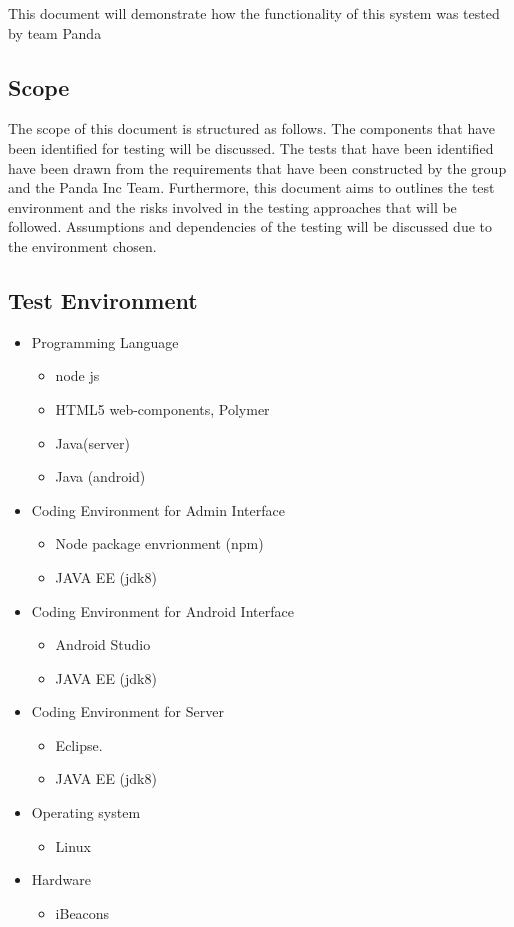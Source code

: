 \documentclass[11pt]{article}
\begin{document}
This document will demonstrate how the functionality of this system was tested by team Panda

\subsection{Scope}
The scope of this document is structured as follows. The components that have been identified for testing will be discussed. The tests that have been identified have been drawn from the requirements that have been constructed by the group and the Panda Inc Team. Furthermore, this document aims to outlines the test environment and the risks involved in the testing approaches that will be followed. Assumptions and dependencies of the testing will be discussed due to the environment chosen.
\subsection{Test Environment}
\begin{itemize}
	\item Programming Language
	\begin{itemize}
		\item node js
		\item HTML5 web-components, Polymer
		\item Java(server)
		\item Java (android)
	\end{itemize}
	
	\item Coding Environment for Admin Interface
	\begin{itemize}
		\item Node package envrionment (npm)
		\item JAVA EE (jdk8)
	\end{itemize}
	
	\item Coding Environment for Android Interface
	\begin{itemize}
		\item Android Studio
		\item JAVA EE (jdk8)
	\end{itemize}
	\item Coding Environment for Server
	\begin{itemize}
		\item Eclipse.
		\item JAVA EE (jdk8)
	\end{itemize}
	
	\item Operating system
	\begin{itemize}
		\item Linux
	\end{itemize}
	
	\item Hardware
	\begin{itemize}
		\item iBeacons
	\end{itemize}
\end{itemize}
\end{document}

